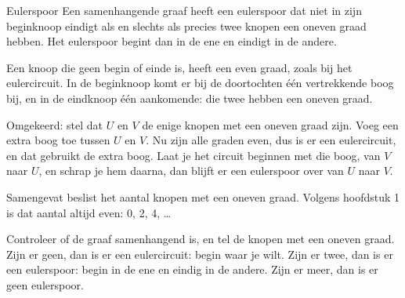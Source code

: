 \begin{theorie}
\begin{stelling}{Eulerspoor}
Een samenhangende graaf heeft een eulerspoor dat niet in zijn beginknoop eindigt als en slechts als precies twee knopen een oneven graad hebben. Het eulerspoor begint dan in de ene en eindigt in de andere.
\end{stelling}
\begin{bewijs}
Een knoop die geen begin of einde is, heeft een even graad, zoals bij het eulercircuit. In de beginknoop komt er bij de doortochten één vertrekkende boog bij, en in de eindknoop één aankomende: die twee hebben een oneven graad.

Omgekeerd: stel dat $U$ en $V$ de enige knopen met een oneven graad zijn. Voeg een extra boog toe tussen $U$ en $V$. Nu zijn alle graden even, dus is er een eulercircuit, en dat gebruikt de extra boog. Laat je het circuit beginnen met die boog, van $V$ naar $U$, en schrap je hem daarna, dan blijft er een eulerspoor over van $U$ naar $V$.
\end{bewijs}
\end{theorie}


Samengevat beslist het aantal knopen met een oneven graad. Volgens hoofdstuk 1 is dat aantal altijd even: 0, 2, 4, \ldots

\begin{werkwijze}
Controleer of de graaf samenhangend is, en tel de knopen met een oneven graad. Zijn er geen, dan is er een eulercircuit: begin waar je wilt. Zijn er twee, dan is er een eulerspoor: begin in de ene en eindig in de andere. Zijn er meer, dan is er geen eulerspoor.
\end{werkwijze}

